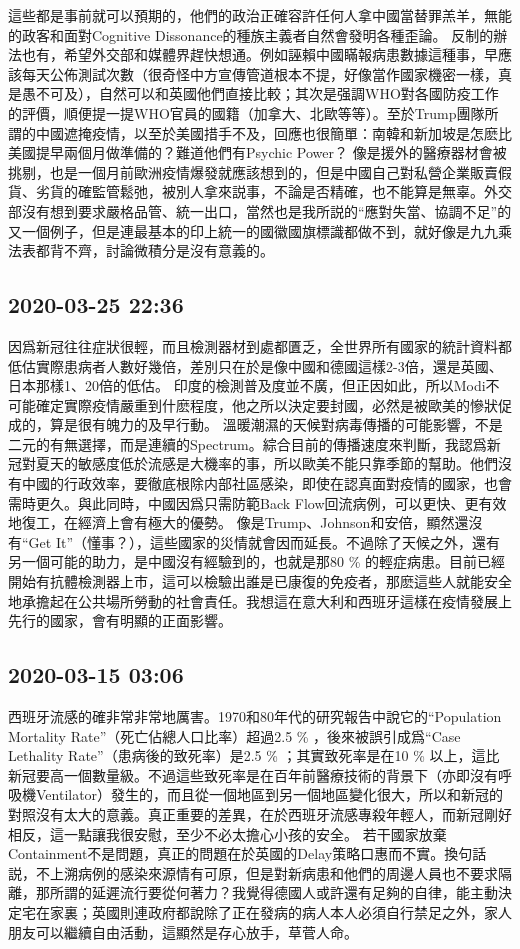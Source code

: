 \documentclass[twocolumn]{ctexart}
\begin{document}
這些都是事前就可以預期的，他們的政治正確容許任何人拿中國當替罪羔羊，無能的政客和面對Cognitive Dissonance的種族主義者自然會發明各種歪論。
反制的辦法也有，希望外交部和媒體界趕快想通。例如誣賴中國瞞報病患數據這種事，早應該每天公佈測試次數（很奇怪中方宣傳管道根本不提，好像當作國家機密一樣，真是愚不可及），自然可以和英國他們直接比較；其次是强調WHO對各國防疫工作的評價，順便提一提WHO官員的國籍（加拿大、北歐等等）。至於Trump團隊所謂的中國遮掩疫情，以至於美國措手不及，回應也很簡單：南韓和新加坡是怎麽比美國提早兩個月做準備的？難道他們有Psychic Power？
像是援外的醫療器材會被挑剔，也是一個月前歐洲疫情爆發就應該想到的，但是中國自己對私營企業販賣假貨、劣貨的確監管鬆弛，被別人拿來説事，不論是否精確，也不能算是無辜。外交部沒有想到要求嚴格品管、統一出口，當然也是我所説的“應對失當、協調不足”的又一個例子，但是連最基本的印上統一的國徽國旗標識都做不到，就好像是九九乘法表都背不齊，討論微積分是沒有意義的。
\subsection*{2020-03-25 22:36}

因爲新冠往往症狀很輕，而且檢測器材到處都匱乏，全世界所有國家的統計資料都低估實際患病者人數好幾倍，差別只在於是像中國和德國這樣2-3倍，還是英國、日本那樣1、20倍的低估。
印度的檢測普及度並不廣，但正因如此，所以Modi不可能確定實際疫情嚴重到什麽程度，他之所以決定要封國，必然是被歐美的慘狀促成的，算是很有魄力的及早行動。
溫暖潮濕的天候對病毒傳播的可能影響，不是二元的有無選擇，而是連續的Spectrum。綜合目前的傳播速度來判斷，我認爲新冠對夏天的敏感度低於流感是大機率的事，所以歐美不能只靠季節的幫助。他們沒有中國的行政效率，要徹底根除内部社區感染，即使在認真面對疫情的國家，也會需時更久。與此同時，中國因爲只需防範Back Flow回流病例，可以更快、更有效地復工，在經濟上會有極大的優勢。
像是Trump、Johnson和安倍，顯然還沒有“Get It”（懂事？），這些國家的災情就會因而延長。不過除了天候之外，還有另一個可能的助力，是中國沒有經驗到的，也就是那80 \% 的輕症病患。目前已經開始有抗體檢測器上市，這可以檢驗出誰是已康復的免疫者，那麽這些人就能安全地承擔起在公共場所勞動的社會責任。我想這在意大利和西班牙這樣在疫情發展上先行的國家，會有明顯的正面影響。
\subsection*{2020-03-15 03:06}

西班牙流感的確非常非常地厲害。1970和80年代的研究報告中說它的“Population Mortality Rate”（死亡佔總人口比率）超過2.5 \% ，後來被誤引成爲“Case Lethality Rate”（患病後的致死率）是2.5 \% ；其實致死率是在10 \% 以上，這比新冠要高一個數量級。不過這些致死率是在百年前醫療技術的背景下（亦即沒有呼吸機Ventilator）發生的，而且從一個地區到另一個地區變化很大，所以和新冠的對照沒有太大的意義。真正重要的差異，在於西班牙流感專殺年輕人，而新冠剛好相反，這一點讓我很安慰，至少不必太擔心小孩的安全。
若干國家放棄Containment不是問題，真正的問題在於英國的Delay策略口惠而不實。換句話説，不上溯病例的感染來源情有可原，但是對新病患和他們的周邊人員也不要求隔離，那所謂的延遲流行要從何著力？我覺得德國人或許還有足夠的自律，能主動決定宅在家裏；英國則連政府都說除了正在發病的病人本人必須自行禁足之外，家人朋友可以繼續自由活動，這顯然是存心放手，草菅人命。
\end{document}
